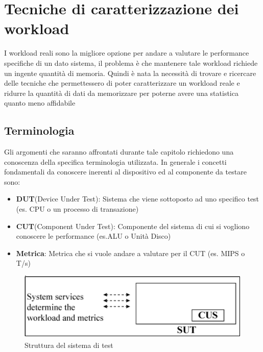 \chapter{Tecniche di caratterizzazione dei workload}
I workload reali sono la migliore opzione per andare a valutare le performance specifiche di un dato sistema, il problema è che mantenere tale workload richiede un ingente quantità di memoria. Quindi è nata la necessità di trovare e ricercare delle tecniche che permettessero di poter caratterizzare un workload reale e ridurre la quantità di dati da memorizzare per poterne avere una statistica quanto meno affidabile

\section{Terminologia}
Gli argomenti che saranno affrontati durante tale capitolo richiedono una conoscenza della specifica terminologia utilizzata. In generale i concetti fondamentali da conoscere inerenti al dispositivo ed al componente da testare sono:
\begin{itemize}
    \item \textbf{DUT}(Device Under Test): Sistema che viene sottoposto ad uno specifico test (es. CPU o un processo di transazione)
    \item \textbf{CUT}(Component Under Test): Componente del sistema di cui si vogliono conoscere le performance (es.ALU o Unità Disco)
    \item \textbf{Metrica}: Metrica che si vuole andare a valutare per il CUT (es. MIPS o T/s)
\end{itemize}

\begin{figure}[h]
\centering
\includegraphics[width=.8\textwidth]{img/chapter-3/CUS-SUT.png}
\caption{Struttura del sistema di test}\label{img:cus-sut}
\end{figure}

